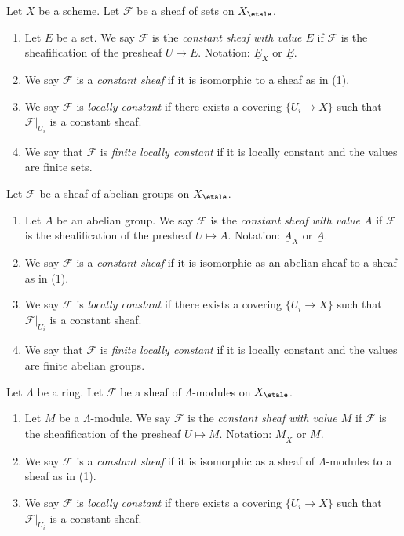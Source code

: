 \begin{definition}
\label{definition-finite-locally-constant}
Let $X$ be a scheme.
Let $\mathcal{F}$ be a sheaf of sets on $X_\etale$.
\begin{enumerate}
\item Let $E$ be a set. We say $\mathcal{F}$ is the
{\it constant sheaf with value $E$} if $\mathcal{F}$ is the
sheafification of the presheaf $U \mapsto E$.
Notation: $\underline{E}_X$ or $\underline{E}$.
\item We say $\mathcal{F}$ is a {\it constant sheaf} if it is
isomorphic to a sheaf as in (1).
\item We say $\mathcal{F}$ is {\it locally constant} if there exists a
covering $\{U_i \to X\}$ such that $\mathcal{F}|_{U_i}$ is a constant sheaf.
\item We say that $\mathcal{F}$ is {\it finite locally constant} if it
is locally constant and the values are finite sets.
\end{enumerate}
Let $\mathcal{F}$ be a sheaf of abelian groups on $X_\etale$.
\begin{enumerate}
\item Let $A$ be an abelian group.
We say $\mathcal{F}$ is the {\it constant sheaf with value $A$} if
$\mathcal{F}$ is the sheafification of the presheaf $U \mapsto A$.
Notation: $\underline{A}_X$ or $\underline{A}$.
\item We say $\mathcal{F}$ is a {\it constant sheaf} if it is isomorphic
as an abelian sheaf to a sheaf as in (1).
\item We say $\mathcal{F}$ is {\it locally constant} if there exists a
covering $\{U_i \to X\}$ such that $\mathcal{F}|_{U_i}$ is a constant sheaf.
\item We say that $\mathcal{F}$ is {\it finite locally constant} if it
is locally constant and the values are finite abelian groups.
\end{enumerate}
Let $\Lambda$ be a ring. Let $\mathcal{F}$ be a sheaf of $\Lambda$-modules
on $X_\etale$.
\begin{enumerate}
\item Let $M$ be a $\Lambda$-module.
We say $\mathcal{F}$ is the {\it constant sheaf with value $M$} if
$\mathcal{F}$ is the sheafification of the presheaf $U \mapsto M$.
Notation: $\underline{M}_X$ or $\underline{M}$.
\item We say $\mathcal{F}$ is a {\it constant sheaf} if it is isomorphic
as a sheaf of $\Lambda$-modules to a sheaf as in (1).
\item We say $\mathcal{F}$ is {\it locally constant} if there exists a
covering $\{U_i \to X\}$ such that $\mathcal{F}|_{U_i}$ is a constant sheaf.
\end{enumerate}
\end{definition}

